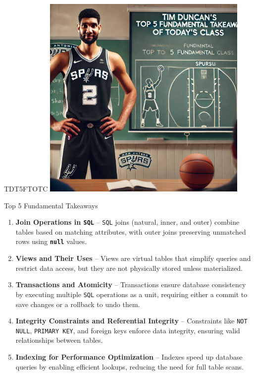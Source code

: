 \documentclass{beamer}
\begin{document}
\begin{frame}{TDT5FTOTC}
    \centering
    \includegraphics[width=0.75\textwidth]{figures/tim.png}
\end{frame}

\begin{frame}{Top 5 Fundamental Takeaways}
    \small
    \begin{enumerate}
        \item[5] \textbf{Join Operations in \texttt{SQL}} – \texttt{SQL} joins (natural, inner, and outer) combine tables based on matching attributes, with outer joins preserving unmatched rows using \texttt{\textbf{null}} values.
        \pause
        \item[4] \textbf{Views and Their Uses} – Views are virtual tables that simplify queries and restrict data access, but they are not physically stored unless materialized.
        \pause
        \item[3] \textbf{Transactions and Atomicity} – Transactions ensure database consistency by executing multiple \texttt{SQL} operations as a unit, requiring either a commit to save changes or a rollback to undo them.
        \pause
        \item[2] \textbf{Integrity Constraints and Referential Integrity} – Constraints like \texttt{NOT NULL}, \texttt{PRIMARY KEY}, and foreign keys enforce data integrity, ensuring valid relationships between tables.
        \pause
        \item[1] \textbf{Indexing for Performance Optimization} – Indexes speed up database queries by enabling efficient lookups, reducing the need for full table scans.
    \end{enumerate}
\end{frame}
\end{document}
